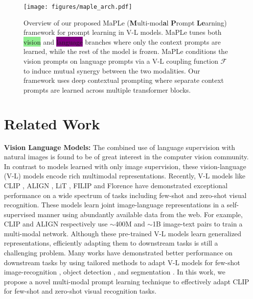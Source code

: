 \documentclass[10pt,twocolumn,letterpaper]{article}
\begin{document}
\begin{figure*}[!t]
\centering
{\texttt{[image: figures/maple\_arch.pdf]}}
\caption{\small Overview of our proposed MaPLe (\textbf{M}ulti-mod\textbf{a}l \textbf{P}rompt \textbf{Le}arning) framework for prompt learning in V-L models. MaPLe tunes both {\setlength{\fboxsep}{0.7pt}\colorbox{lightgreen}{vision}} and {\setlength{\fboxsep}{0.7pt}\colorbox{purple}{language}} branches where only the  {\setlength{\fboxsep}{0.7pt}\colorbox{lightred}{context prompts}} are learned, while the rest of the model is frozen. MaPLe conditions the vision prompts on language prompts via a V-L coupling function $\mathcal{F}$ to induce mutual synergy between the two modalities. Our framework uses deep contextual prompting where separate context prompts are learned across multiple transformer blocks.}
\label{ovd_block_diag}
\end{figure*}


\section{Related Work}
\noindent \textbf{Vision Language Models:}
The combined use of language supervision with natural images is found to be of great interest in the computer vision community. In contrast to models learned with only image supervision, these vision-language (V-L) models encode rich multimodal representations. Recently, V-L models like CLIP \cite{radford2021learning}, ALIGN \cite{jia2021scaling}, LiT \cite{zhai2022lit}, FILIP \cite{yao2021filip} and Florence \cite{yuan2021florence} have demonstrated exceptional performance on a wide spectrum of tasks including few-shot and zero-shot visual recognition. These models learn joint image-language representations in a self-supervised manner using abundantly available data from the web.
For example, CLIP and ALIGN respectively use $\sim$400M and $\sim$1B image-text pairs to train a multi-modal network. Although these pre-trained V-L models learn generalized representations, efficiently adapting them to downstream tasks is still a challenging problem. Many works have demonstrated better performance on downstream tasks by using tailored methods to adapt V-L models for few-shot image-recognition \cite{gao2021clip,zhang2021tip,kim2022how}, object detection \cite{rasheed2022bridging, Maaz2022Multimodal, zhou2022detecting, gu2021open, zang2022open, feng2022promptdet}, and segmentation \cite{li2022language,rao2022denseclip,ding2022decoupling,luddecke2022image}. 
In this work, we propose a novel multi-modal prompt learning technique to effectively adapt CLIP for few-shot and zero-shot visual recognition tasks.
\end{document}
